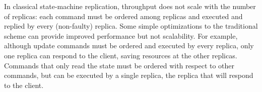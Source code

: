 

In classical state-machine replication, throughput does not scale with the number of replicas: each command must be ordered among replicas and executed and replied by every (non-faulty) replica.
Some simple optimizations to the traditional scheme can provide improved performance but not scalability.
For example, although update commands must be ordered and executed by every replica, only one replica can respond to the client, saving resources at the other replicas.
Commands that only read the state must be ordered with respect to other commands, but can be executed by a single replica, the replica that will respond to the client.

%
%


